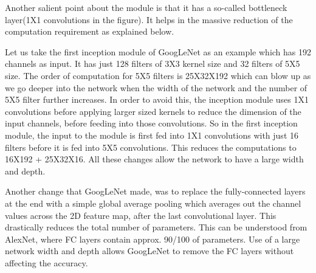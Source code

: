 \documentclass[../main.tex]{subfiles}
\begin{document}
Another salient point about the module is that it has a so-called bottleneck layer(1X1 convolutions in the figure). It helps in the massive reduction of the computation requirement as explained below.

Let us take the first inception module of GoogLeNet as an example which has 192 channels as input. It has just 128 filters of 3X3 kernel size and 32 filters of 5X5 size. The order of computation for 5X5 filters is 25X32X192 which can blow up as we go deeper into the network when the width of the network and the number of 5X5 filter further increases. In order to avoid this, the inception module uses 1X1 convolutions before applying larger sized kernels to reduce the dimension of the input channels, before feeding into those convolutions. So in the first inception module, the input to the module is first fed into 1X1 convolutions with just 16 filters before it is fed into 5X5 convolutions. This reduces the computations to 16X192 +  25X32X16. All these changes allow the network to have a large width and depth.

Another change that GoogLeNet made, was to replace the fully-connected layers at the end with a simple global average pooling which averages out the channel values across the 2D feature map, after the last convolutional layer. This drastically reduces the total number of parameters. This can be understood from AlexNet, where FC layers contain approx. 90/100 of parameters. Use of a large network width and depth allows GoogLeNet to remove the FC layers without affecting the accuracy.
\cite{multi}
\vspace{5mm}
\end{document}
